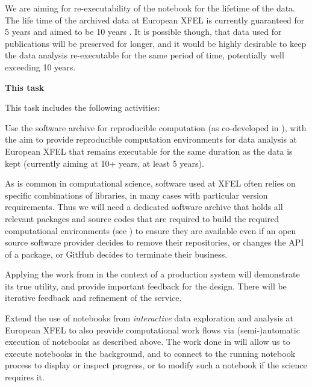 \begin{task}[
  title=Reproducible photon science workflows at European XFEL,
  id=reproducibility-xfel,
  lead=XFEL,
  PM=38,
  wphases={7-48},
  partners={INSERM,SRL,UPSUD,EGI}
  ]
  We are aiming for re-executability of the notebook for the lifetime
  of the data. The life time of the archived data at European XFEL is
  currently guaranteed for 5 years and aimed to be 10 years
  \cite{EuXFEL-datapolicy-2017}. It is possible though, that data used
  for publications will be preserved for longer, and it would be
  highly desirable to keep the data analysis re-executable for the
  same period of time, potentially well exceeding 10 years.

  \medskip \textbf{This task}

  This task includes the following activities:
  \begin{compactitem}
  \item Use the software archive for reproducible computation
    (as co-developed in ), with
    the aim to provide reproducible computation environments for data analysis at
    European XFEL that remains executable for the same duration as the
    data is kept (currently aiming at 10+ years, at least 5 years).

    As is common in computational science, software used at XFEL often
    relies on specific combinations of libraries, in many cases with
    particular version requirements. Thus we will need a dedicated
    software archive that holds all relevant packages and source codes
    that are required to build the required computational environments
    (see ) to ensure they are
    available even if an open source software provider decides to
    remove their repositories, or changes the API of a package, or
    GitHub decides to terminate their business.

    Applying the work from  in the
    context of a production system will demonstrate its true utility,
    and provide important feedback for the design. There will be
    iterative feedback and refinement of the service.

  \item Extend the use of notebooks from \emph{interactive} data
    exploration and analysis at European XFEL to also provide
    computational work flows via (semi-)automatic execution of
    notebooks as described above. The work done in
     will allow us to execute notebooks in
    the background, and to connect to the running notebook process to
    display or inspect progress, or to modify such a notebook if the
    science requires it.


\end{compactitem}
\end{task}
